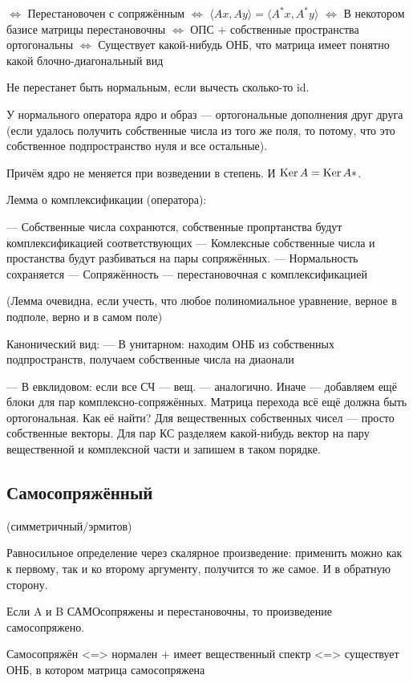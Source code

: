 \documentclass[12pt, a4paper]{article}
\begin{document}
$\Longleftrightarrow$ Перестановочен с сопряжённым 
$\Longleftrightarrow$ $\langle A x, A y \rangle = \langle A^* x, A^* y \rangle$ 
$\Longleftrightarrow$ В некотором базисе матрицы перестановочны
$\Longleftrightarrow$ ОПС + собственные пространства ортогональны 
$\Longleftrightarrow$ Существует какой-нибудь ОНБ, что матрица имеет понятно какой блочно-диагональный вид


Не перестанет быть нормальным, если вычесть сколько-то id.

У нормального оператора ядро и образ — ортогональные дополнения друг друга (если удалось получить собственные числа из того же поля, то потому, что это собственное подпространство нуля и все остальные).

Причём ядро не меняется при возведении в степень. И $\operatorname{Ker} A = \operatorname{Ker} A*$.

Лемма о комплексификации (оператора):

— Собственные числа сохранются, собственные пропртанства будут комплексификацией соответствующих
— Комлексные собственные числа и простанства будут разбиваться на пары сопряжённых.
— Нормальность сохраняется
— Сопряжённость — перестановочная с комплексификацией

(Лемма очевидна, если учесть, что любое полиномиальное уравнение, верное в подполе, верно и в самом поле)


Канонический вид:
— В унитарном: находим ОНБ из собственных подпространств, получаем собственные числа на диаонали

— В евклидовом: если все СЧ — вещ. — аналогично. Иначе — добавляем ещё блоки для пар комплексно-сопряжённых.
Матрица перехода всё ещё должна быть ортогональная. Как её найти? Для вещественных собственных чисел — просто собственные векторы. 
Для пар КС разделяем какой-нибудь вектор на пару вещественной и комплексной части и запишем в таком порядке.


\subsection{Самосопряжённый}

(симметричный/эрмитов)

Равносильное определение через скалярное произведение: применить можно как к первому, так и ко второму аргументу, получится то же самое.
И в обратную сторону.

Если A и B САМОсопряжены и перестановочны, то произведение самосопряжено.

Самосопряжён 
<=> нормален + имеет вещественный спектр
<=> существует ОНБ, в котором матрица самосопряжена
\end{document}
